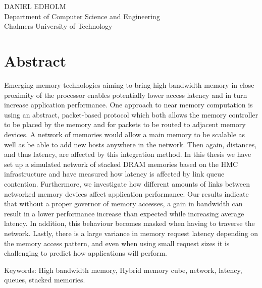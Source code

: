 \THETITLE\\
\TITLEDESCR\\
DANIEL EDHOLM\\
Department of Computer Science and Engineering\\
Chalmers University of Technology\\

\thispagestyle{plain}			%
\section*{Abstract}
Emerging memory technologies aiming to bring high bandwidth memory in close proximity of the processor enables potentially lower access latency and in turn increase application performance. One approach to near memory computation is using an abstract, packet-based protocol which both allows the memory controller to be placed by the memory and for packets to be routed to adjacent memory devices. A network of memories would allow a main memory to be scalable as well as be able to add new hosts anywhere in the network. Then again, distances, and thus latency, are affected by this integration method. In this thesis we have set up a simulated network of stacked DRAM memories based on the HMC infrastructure and have measured how latency is affected by link queue contention. Furthermore, we investigate how different amounts of links between networked memory devices affect application performance. Our results indicate that without a proper governor of memory accesses, a gain in bandwidth can result in a lower performance increase than expected while increasing average latency. In addition, this behaviour becomes masked when having to traverse the network. Lastly, there is a large variance in memory request latency depending on the memory access pattern, and even when using small request sizes it is challenging to predict how applications will perform.

\vfill
Keywords: High bandwidth memory, Hybrid memory cube, network, latency, queues, stacked memories.

\newpage				%
\thispagestyle{empty}
\mbox{}